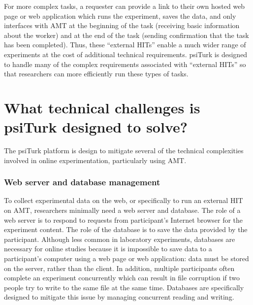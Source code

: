\documentclass[twocolumn]{svjour3}          %
\newcommand{\psiturk}[0]{\textsf{psiTurk}}
\begin{document}
For more complex tasks, a requester can provide a link to their own hosted web page or
web application which runs the 
experiment, saves the data, and only interfaces with AMT at the beginning of the task (receiving 
basic information about the worker) and at the end of the task (sending confirmation that the task 
has been completed).  Thus, these ``external HITs'' enable a much wider range of experiments at 
the cost of additional technical requirements.  \psiturk{} is designed to handle many of the 
complex requirements associated with ``external HITs'' so that researchers can more efficiently run 
these types of tasks.



\section{What technical challenges is \psiturk{} designed to solve?}

The \psiturk{} platform is design to mitigate several of the technical complexities
involved in online experimentation, particularly using AMT.

\subsubsection{Web server and database management}
\label{sec:web-and-database}

To collect experimental data on the web, or specifically to run an external HIT on AMT, 
researchers minimally need a web server and database.  
The role of a web server is to respond to requests from participant's Internet browser 
for the experiment content.  The role of the database is to save the data provided by 
the participant.  Although less common in laboratory experiments, databases are 
necessary for online studies because it is impossible to save data to a participant's 
computer using a web page or web application: data must be stored on the server,
rather than the client.  In addition, multiple participants often complete an 
experiment concurrently which can result in file corruption if two people try to
write to the same file at the same time. Databases are specifically designed to 
mitigate this issue by managing concurrent reading and writing.
 
\end{document}
